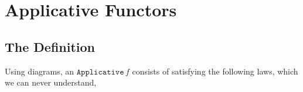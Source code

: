 \documentclass{article}
\begin{document}
\section{Applicative Functors}

\subsection{The Definition}

Using diagrams, an $\texttt{Applicative}\,f$ consists of
satisfying the following laws, which we can never understand,
\end{document}
